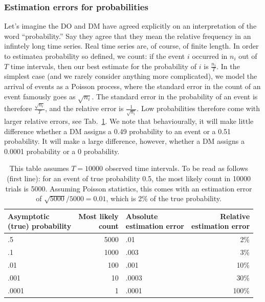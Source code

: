 \documentclass[a4paper, 12pt]{article}
\newcommand{\tlabel}[1]{\label{tab:#1}}
\newcommand{\tref}[1]{Tab.~\ref{tab:#1}}
\begin{document}
\subsubsection*{Estimation errors for probabilities}
Let's imagine the DO and DM have agreed explicitly on an interpretation of the word ``probability.'' Say they agree that they mean the relative frequency in an infintely long time series. Real time series are, of course, of finite length. In order to estimatea probability so defined, we count: if the event $i$ occurred in $n_i$ out of $T$ time intervals, then our best estimate for the probability of $i$ is $\frac{n_i}{T}$. In the simplest case (and we rarely consider anything more complicated), we model the arrival of events as a Poisson process, where the standard error in the count of an event famously goes as $\sqrt{n_i}$. The standard error in the probability of an event is therefore $\frac{\sqrt{n_i}}{T}$, and the relative error is $\frac{1}{\sqrt{n_i}}$. Low probabilities therefore come with larger relative errors, see \tref{errors}. We note that behaviourally, it will make little difference whether a DM assigns a 0.49 probability to an event or a 0.51 probability. It will make a large difference, however, whether a DM assigns a 0.0001 probability or a 0 probability.

\begin{table}[!htb]
\centering
\begin{tabular}{@{}lrlr@{}}
\toprule[2pt]
\makecell{Asymptotic\\(true) probability} & \makecell{Most likely\\count} & \makecell{Absolute\\estimation error} & \makecell{Relative\\estimation error}\\
\midrule[2pt]
.5 & 5000 & .01 & 2\%\\
.1 & 1000& .003 & 3\%\\
.01 & 100& .001 & 10\%\\
.001 & 10& .0003& 30\%\\
.0001 & 1& .0001 &100\%\\
\bottomrule[2pt]
\end{tabular}
\caption{This table assumes $T = 10000$ observed time intervals. To be read as follows (first line): for an event of true probability 0.5, the most likely count in 10000 trials is 5000. Assuming Poisson statistics, this comes with an estimation error of $\sqrt{5000}/5000=0.01$, which is 2\% of the true probability.}\tlabel{errors}
\end{table}
\end{document}
